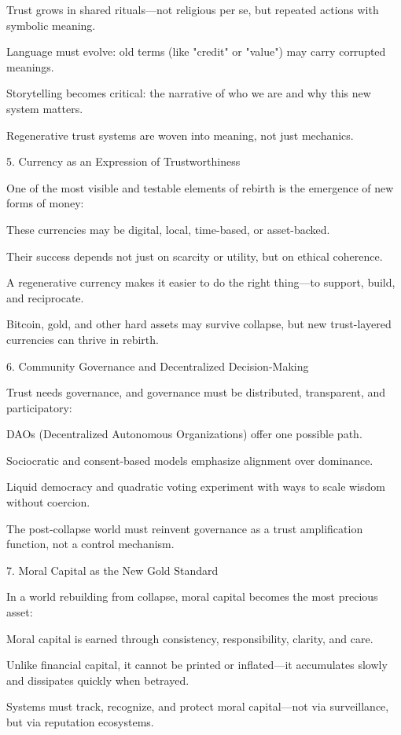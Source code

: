 \documentclass[11pt,oneside]{book}
\begin{document}
    Trust grows in shared rituals—not religious per se, but repeated actions with symbolic meaning.

    Language must evolve: old terms (like "credit" or "value") may carry corrupted meanings.

    Storytelling becomes critical: the narrative of who we are and why this new system matters.

Regenerative trust systems are woven into meaning, not just mechanics.

5. Currency as an Expression of Trustworthiness


One of the most visible and testable elements of rebirth is the emergence of new forms of money:

    These currencies may be digital, local, time-based, or asset-backed.

    Their success depends not just on scarcity or utility, but on ethical coherence.

    A regenerative currency makes it easier to do the right thing—to support, build, and reciprocate.

Bitcoin, gold, and other hard assets may survive collapse, but new trust-layered currencies can thrive in rebirth.

6. Community Governance and Decentralized Decision-Making


Trust needs governance, and governance must be distributed, transparent, and participatory:

    DAOs (Decentralized Autonomous Organizations) offer one possible path.

    Sociocratic and consent-based models emphasize alignment over dominance.

    Liquid democracy and quadratic voting experiment with ways to scale wisdom without coercion.

The post-collapse world must reinvent governance as a trust amplification function, not a control mechanism.

7. Moral Capital as the New Gold Standard


In a world rebuilding from collapse, moral capital becomes the most precious asset:

    Moral capital is earned through consistency, responsibility, clarity, and care.

    Unlike financial capital, it cannot be printed or inflated—it accumulates slowly and dissipates quickly when betrayed.

    Systems must track, recognize, and protect moral capital—not via surveillance, but via reputation ecosystems.
\end{document}
